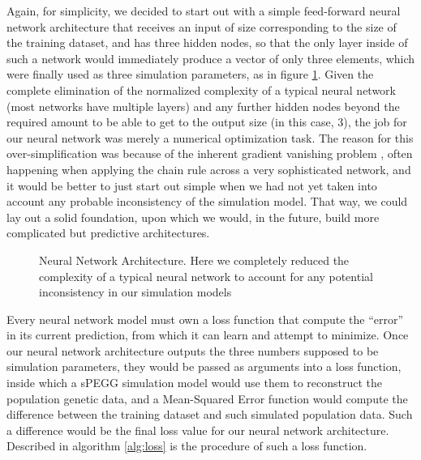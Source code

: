 \documentclass[12pt]{article}
\begin{document}
Again, for simplicity, we decided to start out with a simple feed-forward neural network architecture that receives an input of size corresponding to the size of the training dataset, and has three hidden nodes, so that the only layer inside of such a network would immediately produce a vector of only three elements, which were finally used as three simulation parameters, as in figure \ref{fig:nn}. Given the complete elimination of the normalized complexity of a typical neural network (most networks have multiple layers) and any further hidden nodes beyond the required amount to be able to get to the output size (in this case, 3), the job for our neural network was merely a numerical optimization task. The reason for this over-simplification was because of the inherent gradient vanishing problem \cite{gradientvanishing2013}, often happening when applying the chain rule across a very sophisticated network, and it would be better to just start out simple when we had not yet taken into account any probable inconsistency of the simulation model. That way, we could lay out a solid foundation, upon which we would, in the future, build more complicated but predictive architectures.

\begin{figure}[H]
    \centering
    \caption{Neural Network Architecture. Here we completely reduced the complexity of a typical neural network to account for any potential inconsistency in our simulation models}
    \label{fig:nn}
\end{figure}

Every neural network model must own a loss function that compute the \enquote{error} in its current prediction, from which it can learn and attempt to minimize. Once our neural network architecture outputs the three numbers supposed to be simulation parameters, they would be passed as arguments into a loss function, inside which a sPEGG simulation model would use them to reconstruct the population genetic data, and a Mean-Squared Error function would compute the difference between the training dataset and such simulated population data. Such a difference would be the final loss value for our neural network architecture. Described in algorithm \ref{alg:loss} is the procedure of such a loss function.
\end{document}
